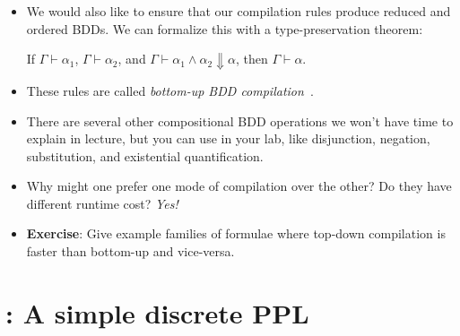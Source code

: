 \documentclass{tufte-handout}
\begin{document}
\begin{itemize}
\begin{proof}
  where $(\star)$ follows from a simple lemma that $\otimes$ distributes over intersection 
  and $(\dagger)$ follows from distributivity properties of union and intersection, 
  in particular the fact that for any sets $A,B,C,D$ it is the case that $(A \cup B) \cap (C \cup D) = 
  (A \cap C) \cup (B \cap D)$.
  
  \end{proof}

  \item We would also like to ensure that our compilation rules produce reduced and ordered 
  BDDs. We can formalize this with a type-preservation theorem:
  \begin{theorem}
    If $\Gamma \vdash \alpha_1$, $\Gamma \vdash \alpha_2$, and $\Gamma \vdash \alpha_1 \land \alpha_2 \Downarrow \alpha$, 
    then $\Gamma \vdash \alpha$.
  \end{theorem}

  \item These rules are called \emph{bottom-up BDD compilation}~\citep{darwiche2002knowledge,oztok2015top}. 
  \item There are several other compositional BDD operations we won't have time
  to explain in lecture, but you can use in your lab, like disjunction, negation, substitution, 
  and existential quantification.
  \item Why might one prefer one mode of compilation over the other? Do they
  have different runtime cost? \emph{Yes!}
  \item \textbf{Exercise}: Give example families of formulae where
  top-down compilation is faster than bottom-up and vice-versa.
\end{itemize}

\section{\disc{}: A simple discrete PPL}
\end{document}
